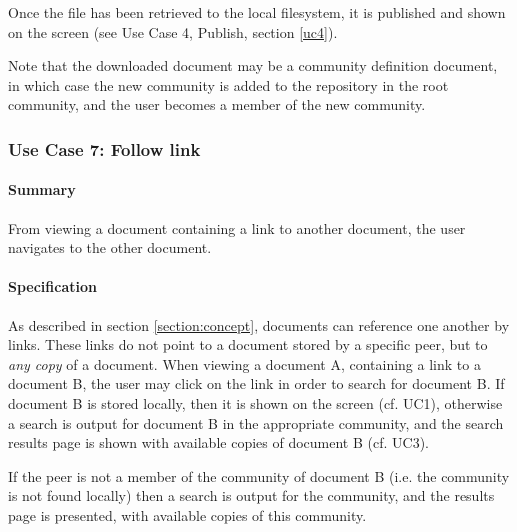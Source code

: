 \documentclass[titlepage]{article}%
\begin{document}
Once the file has been retrieved to the local filesystem, it is published and shown on the screen (see Use Case 4, Publish, section \ref{uc4}).

Note that the downloaded document may be a community definition document, in which case the new community is added to the repository in the root community, and the user becomes a member of the new community.

\subsubsection{Use Case 7: Follow link } 

\paragraph{Summary}
From viewing a document containing a link to another document, the user navigates to the other document.

\paragraph{Specification}
As described in section \ref{section:concept}, documents can reference one another by links. These links do not point to a document stored by a specific peer, but to \emph{any copy} of a document. When viewing a document A, containing a link to a document B, the user may click on the link in order to search for document B. If document B is stored locally, then it is shown on the screen (cf. UC1), otherwise a search is output for document B in the appropriate community, and the search results page is shown with available copies of document B (cf. UC3).

If the peer is not a member of the community of document B (i.e. the community is not found locally) then a search is output for the community, and the results page is presented, with available copies of this community.
\end{document}
